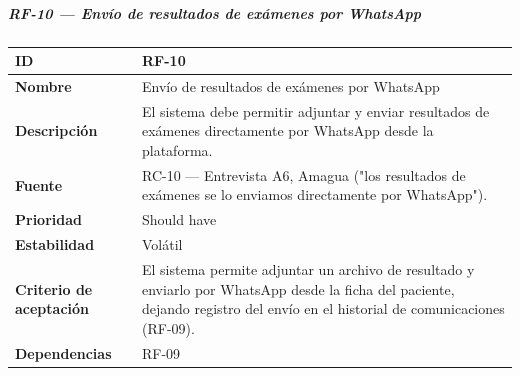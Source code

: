 \documentclass[
]{article}
\newcounter{none} %
\begin{document}
\subparagraph{RF-10 --- Envío de resultados de exámenes por
WhatsApp}\label{rf-10-envuxedo-de-resultados-de-exuxe1menes-por-whatsapp}

{\def\LTcaptype{none} %
\begin{longtable}[]{@{}
  >{\raggedright\arraybackslash}p{}
  >{\raggedright\arraybackslash}p{}@{}}
\toprule\noalign{}
\begin{minipage}[b]{\linewidth}\raggedright
\textbf{ID}
\end{minipage} & \begin{minipage}[b]{\linewidth}\raggedright
RF-10
\end{minipage} \\
\midrule\noalign{}
\endhead
\bottomrule\noalign{}
\endlastfoot
\textbf{Nombre} & \begin{minipage}[t]{\linewidth}\raggedright
Envío de resultados de exámenes por WhatsApp
\end{minipage} \\
\textbf{Descripción} & \begin{minipage}[t]{\linewidth}\raggedright
El sistema debe permitir adjuntar y enviar resultados de exámenes
directamente por WhatsApp desde la plataforma.
\end{minipage} \\
\textbf{Fuente} & \begin{minipage}[t]{\linewidth}\raggedright
RC-10 --- Entrevista A6, Amagua ("los resultados de exámenes se lo
enviamos directamente por WhatsApp").
\end{minipage} \\
\textbf{Prioridad} & \begin{minipage}[t]{\linewidth}\raggedright
Should have
\end{minipage} \\
\textbf{Estabilidad} & \begin{minipage}[t]{\linewidth}\raggedright
Volátil
\end{minipage} \\
\textbf{Criterio de aceptación} &
\begin{minipage}[t]{\linewidth}\raggedright
El sistema permite adjuntar un archivo de resultado y enviarlo por
WhatsApp desde la ficha del paciente, dejando registro del envío en el
historial de comunicaciones (RF-09).
\end{minipage} \\
\textbf{Dependencias} & \begin{minipage}[t]{\linewidth}\raggedright
RF-09
\end{minipage} \\
\end{longtable}
}
\end{document}
